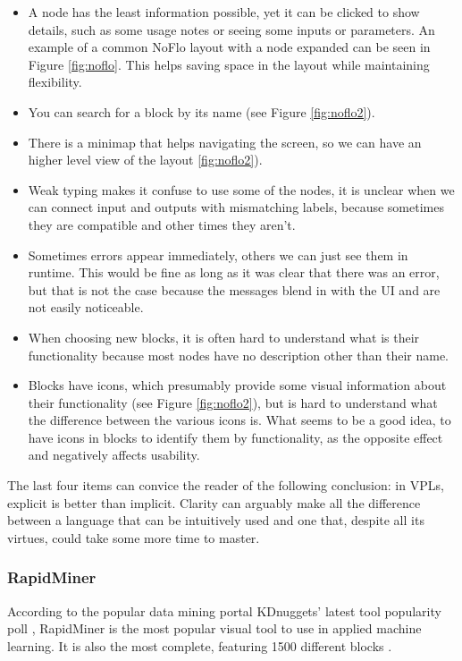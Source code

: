 \begin{itemsize}
\begin{itemize}
  \item A node has the least information possible, yet it can be clicked to
show details, such as some usage notes or seeing some inputs or parameters.
An example of a common NoFlo layout with a node expanded can be seen in Figure
\ref{fig:noflo}. This helps saving space in the layout while maintaining
flexibility.
  \item You can search for a block by its name (see Figure \ref{fig:noflo2}).
  \item There is a minimap that helps navigating the screen, so we can have
an higher level view of the layout \ref{fig:noflo2}).
  \item Weak typing makes it confuse to use some of the nodes, it is unclear
when we can connect input and outputs with mismatching labels, because sometimes
they are compatible and other times they aren't.
  \item Sometimes errors appear immediately, others we can just see them in
runtime. This would be fine as long as it was clear that there was an error,
but that is not the case because the messages blend in with the UI and are
not easily noticeable.
  \item When choosing new blocks, it is often hard to understand what is their
functionality because most nodes have no description other than their name.
  \item Blocks have icons, which presumably provide some visual information
about their functionality (see Figure \ref{fig:noflo2}), but is hard to
understand what the difference between the various icons is. What seems to be a
good idea, to have icons in blocks to identify them by functionality, as the
opposite effect and negatively affects usability.
\end{itemize}

The last four items can convice the reader of the following conclusion: in VPLs, explicit
is better than implicit. Clarity can arguably make all the
difference between a language that can be intuitively used and one that, despite
all its virtues, could take some more time to master.

\subsubsection{RapidMiner}

According to the popular data mining portal KDnuggets' latest tool popularity
poll \cite{kdn}, RapidMiner is the most popular visual tool to use in applied
machine learning. It is also the most complete, featuring 1500 different blocks \cite{rapidminer}.


\end{itemsize}
